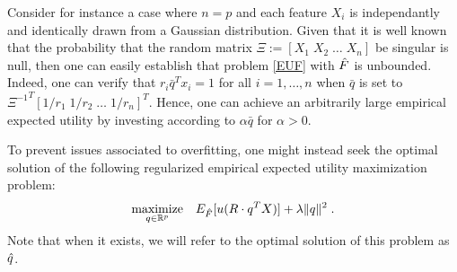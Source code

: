 \begin{ex}
  Consider for instance a case where $n=p$ and each feature $X_i$ is independantly and
  identically drawn from a Gaussian distribution. Given that it is well known that the
  probability that the random matrix $\Xi := [X_1\;X_2\;\dots\;X_n]$ be singular is null,
  then one can easily establish that problem \eqref{EUF} with ${\hat{F}}$ is
  unbounded. Indeed, one can verify that $r_i \bar{q}^T x_i = 1$ for all $i=1,\dots,n$
  when $\bar{q}$ is set to ${\Xi^{-1}}^T [1/r_1\;1/r_2\;\dots\;1/r_n]^T$. Hence, one can
  achieve an arbitrarily large empirical expected utility by investing according to
  $\alpha\bar{q}$ for $\alpha>0$.
\end{ex}

To prevent issues associated to overfitting, one might instead seek the optimal solution
of the following regularized empirical expected utility maximization problem:
\begin{equation}
\operatorname*{maximize}_{q\in\mathbb{R}^p}\;\;\;E_{\hat{F}}[u(R\cdot q^TX)]+\lambda\|q\|^2\;.\label{EUFhatReg}
\end{equation}
Note that when it exists, we will refer to the optimal solution of this problem as ${\hat{q}}$.








